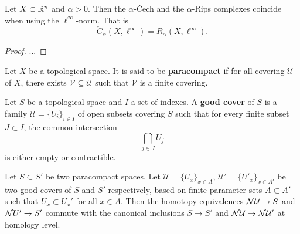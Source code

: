 \begin{lemma} \label{lemma:haus-aux-2}
    Let $ X \subset \mathbb R^n $ and $ \alpha > 0 $. Then the $\alpha$-\v Cech and the $\alpha$-Rips complexes coincide when using the $ \ell^\infty $-norm. That is
    $$
        \check C_\alpha(X, \ell^\infty) = R_\alpha(X, \ell^\infty).
    $$
\end{lemma}
\begin{proof}
    ...
\end{proof}

\begin{definition}
    Let $ X $ be a topological space. It is said to be {\bf paracompact} if for all covering $ \mathcal U $ of $ X $, there exists $ \mathcal V \subseteq \mathcal U $ such that $ \mathcal V $ is a finite covering.
\end{definition}

\begin{definition}
    Let $ S $ be a topological space and $ I $ a set of indexes. A {\bf good cover} of $ S $ is a family $ \mathcal U = \{U_i\}_{i\in I} $ of open subsets covering $ S $ such that for every finite subset $ J \subset I $, the common intersection
    \begin{equation}
        \bigcap_{j\in J} U_j
    \end{equation}
    is either empty or contractible.
\end{definition}

\begin{lemma} \label{lemma:haus-aux-3}
    Let $ S \subset S' $ be two paracompact spaces. Let $ \mathcal U = \{U_x\}_{x \in A}$, $ \mathcal U' = \{U'_x\}_{x \in A'}$ be two good covers of $ S $ and $ S'$ respectively, based on finite parameter sets $ A \subset A ' $ such that $ U_x \subset U_x' $ for all $ x \in A $. Then the homotopy equivalences $ \mathcal{N} \mathcal U \to S $ and $\mathcal{N} U' \to S' $ commute with the canonical inclusions $ S \to S' $ and $ \mathcal{N} \mathcal U \to \mathcal{N} \mathcal U' $ at homology level.
\end{lemma}

